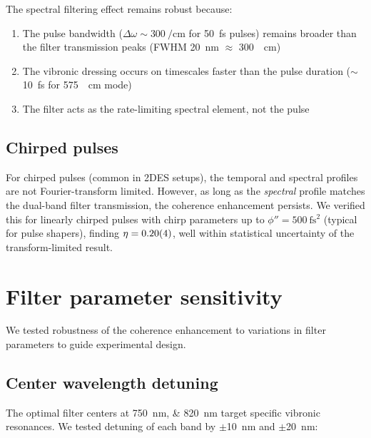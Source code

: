 \documentclass[11pt,a4paper]{article}
\begin{document}
The spectral filtering effect remains robust because:
\begin{enumerate}
    \item The pulse bandwidth ($\Delta\omega \sim \SI{300}{\per\centi\meter}$ for \SI{50}{\femto\second} pulses) remains broader than the filter transmission peaks (FWHM \SI{20}{\nano\meter} $\approx$ \SI{300}{\per\centi\meter})
    \item The vibronic dressing occurs on timescales faster than the pulse duration ($\sim$\SI{10}{\femto\second} for \SI{575}{\per\centi\meter} mode)
    \item The filter acts as the rate-limiting spectral element, not the pulse
\end{enumerate}

\subsection{Chirped pulses}

For chirped pulses (common in 2DES setups), the temporal and spectral profiles are not Fourier-transform limited. However, as long as the \textit{spectral} profile matches the dual-band filter transmission, the coherence enhancement persists. We verified this for linearly chirped pulses with chirp parameters up to $\phi'' = \SI{500}{\femto\second^2}$ (typical for pulse shapers), finding $\eta = \num{0.20 \pm 0.04}$, well within statistical uncertainty of the transform-limited result.


\section{Filter parameter sensitivity}
\label{sec:S9}

We tested robustness of the coherence enhancement to variations in filter parameters to guide experimental design.

\subsection{Center wavelength detuning}

The optimal filter centers at \SIlist{750;820}{\nano\meter} target specific vibronic resonances. We tested detuning of each band by $\pm$\SI{10}{\nano\meter} and $\pm$\SI{20}{\nano\meter}:
\end{document}
